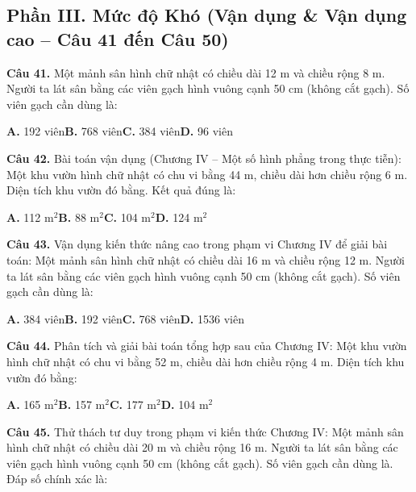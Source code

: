 \documentclass[11pt,a4paper]{article}
\begin{document}
\subsection*{\color{accent} Phần III. Mức độ Khó (Vận dụng \& Vận dụng cao -- Câu 41 đến Câu 50)}
\textbf{\color{primary} Câu 41.} Một mảnh sân hình chữ nhật có chiều dài 12 m và chiều rộng 8 m. Người ta lát sân bằng các viên gạch hình vuông cạnh 50 cm (không cắt gạch). Số viên gạch cần dùng là:\par
\hspace*{1.5em}\textbf{A.} 192 viên\quad\quad \textbf{B.} 768 viên\quad\quad \textbf{C.} 384 viên\quad\quad \textbf{D.} 96 viên\par\vspace{2pt}
\textbf{\color{primary} Câu 42.} Bài toán vận dụng (Chương IV – Một số hình phẳng trong thực tiễn): Một khu vườn hình chữ nhật có chu vi bằng 44 m, chiều dài hơn chiều rộng 6 m. Diện tích khu vườn đó bằng. Kết quả đúng là:\par
\hspace*{1.5em}\textbf{A.} 112 m$^2$\quad\quad \textbf{B.} 88 m$^2$\quad\quad \textbf{C.} 104 m$^2$\quad\quad \textbf{D.} 124 m$^2$\par\vspace{2pt}
\textbf{\color{primary} Câu 43.} Vận dụng kiến thức nâng cao trong phạm vi Chương IV để giải bài toán: Một mảnh sân hình chữ nhật có chiều dài 16 m và chiều rộng 12 m. Người ta lát sân bằng các viên gạch hình vuông cạnh 50 cm (không cắt gạch). Số viên gạch cần dùng là:\par
\hspace*{1.5em}\textbf{A.} 384 viên\quad\quad \textbf{B.} 192 viên\quad\quad \textbf{C.} 768 viên\quad\quad \textbf{D.} 1536 viên\par\vspace{2pt}
\textbf{\color{primary} Câu 44.} Phân tích và giải bài toán tổng hợp sau của Chương IV: Một khu vườn hình chữ nhật có chu vi bằng 52 m, chiều dài hơn chiều rộng 4 m. Diện tích khu vườn đó bằng:\par
\hspace*{1.5em}\textbf{A.} 165 m$^2$\quad\quad \textbf{B.} 157 m$^2$\quad\quad \textbf{C.} 177 m$^2$\quad\quad \textbf{D.} 104 m$^2$\par\vspace{2pt}
\textbf{\color{primary} Câu 45.} Thử thách tư duy trong phạm vi kiến thức Chương IV: Một mảnh sân hình chữ nhật có chiều dài 20 m và chiều rộng 16 m. Người ta lát sân bằng các viên gạch hình vuông cạnh 50 cm (không cắt gạch). Số viên gạch cần dùng là. Đáp số chính xác là:\par
\end{document}
